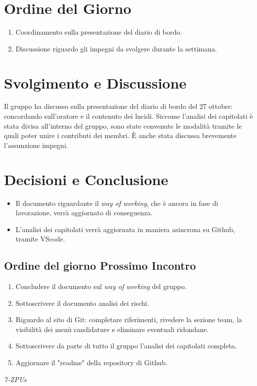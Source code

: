 \documentclass[a4paper,12pt]{article}
\begin{document}
\section{Ordine del Giorno}
\begin{enumerate}
    \item Coordinamento sulla presentazione del diario di bordo.
    \item Discussione riguardo gli impegni da svolgere durante la settimana.
\end{enumerate}
\vspace{0.5cm}
\section{Svolgimento e Discussione}
Il gruppo ha discusso sulla presentazione del diario di bordo del 27 ottobre:  concordando sull'oratore e il contenuto dei lucidi. Siccome l'analisi dei capitolati è stata divisa all'interno del gruppo,  sono state convenute le modalità tramite le quali poter unire i contributi dei membri. È anche stata discussa brevemente l'assunzione impegni.

\vspace{0.5cm}
\section{Decisioni e Conclusione}
\begin{itemize}
    \item Il documento riguardante il \textit{way of working}, che è ancora in fase di lavorazione, verrà aggiornato di conseguenza.
    \item  L'analisi dei capitolati verrà aggiornata in maniera asincrona su Github, tramite VScode. 
\end{itemize}

\subsection{Ordine del giorno Prossimo Incontro}
\begin{enumerate}
    \item Concludere il documento sul \textit{way of working} del gruppo.
    \item Sottoscrivere il documento analisi dei rischi.
    \item Riguardo al sito di Git: completare riferimenti, rivedere la sezione team, la visibilità dei menù candidature e eliminare eventuali ridondane.
    \item Sottoscrivere da parte di tutto il gruppo l'analisi dei capitolati completa.
    \item Aggiornare il "readme" della repository di Github.
\end{enumerate}

\vfill
\begin{flushright}
    \textit{7-ZPUs}
\end{flushright}
\end{document}
